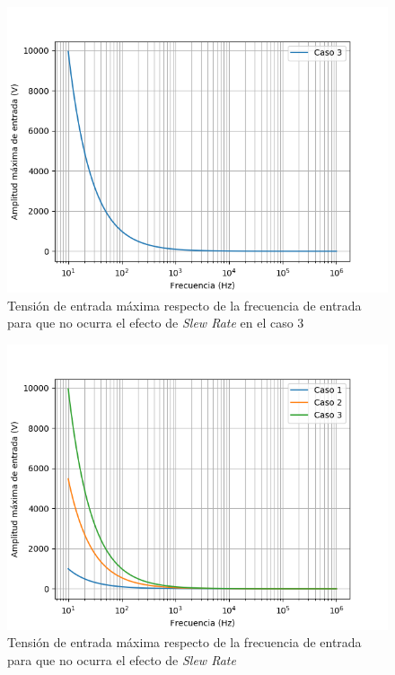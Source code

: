 \begin{figure}[H]
\begin{centering}
\includegraphics[scale=0.5]{../Ex1/ib/Resources1b/slewRate3}
\par\end{centering}
\centering{}\caption{Tensión de entrada máxima respecto de la frecuencia de entrada para
que no ocurra el efecto de \emph{Slew Rate} en el caso 3}
\label{1_b_25}
\end{figure}

\begin{figure}[H]
\begin{centering}
\includegraphics[scale=0.5]{../Ex1/ib/Resources1b/slewRate123}
\par\end{centering}
\centering{}\caption{Tensión de entrada máxima respecto de la frecuencia de entrada para
que no ocurra el efecto de \emph{Slew Rate}}
\label{1_b_26}
\end{figure}

